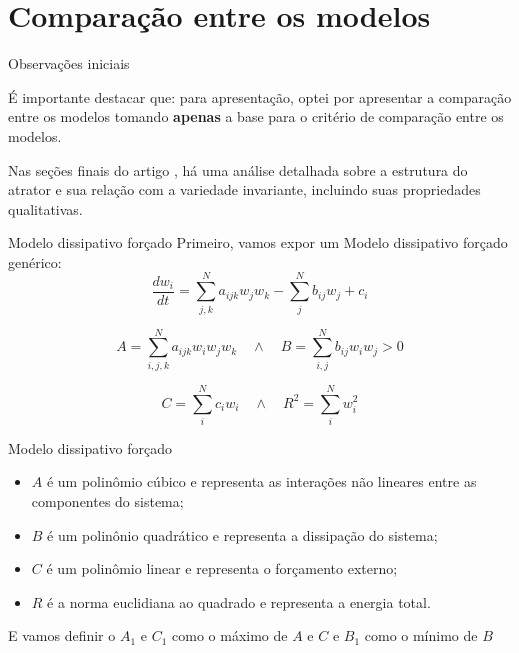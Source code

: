 \section{Comparação entre os modelos} 


\begin{frame}{Observações iniciais}

É importante destacar que: para apresentação, optei por apresentar a comparação entre os modelos tomando \textbf{apenas} a base para o critério de comparação entre os modelos.

Nas seções finais do artigo \cite{lorenz1980}, há uma análise detalhada sobre a estrutura do atrator e sua relação com a variedade invariante, incluindo suas propriedades qualitativas.
\end{frame}


\begin{frame}{Modelo dissipativo forçado}
    Primeiro, vamos expor um Modelo dissipativo forçado genérico:
    \begin{equation}
        \frac{d w_i}{dt} = \sum_{j,k}^N a_{ijk} w_j w_k - \sum_j^N b_{ij} w_j + c_i \label{eq:sistema-generico}
    \end{equation}

    \begin{equation*}
        A = \sum_{i,j,k}^N a_{ijk} w_i w_j w_k \quad \land \quad B = \sum_{i,j}^N b_{ij} w_i w_j > 0
    \end{equation*}

    \begin{equation*}
         C = \sum_i^N c_i w_i \quad \land \quad R^2 = \sum_i^N w_i^2
    \end{equation*}

\end{frame}


\begin{frame}{Modelo dissipativo forçado}

\begin{itemize}
    \item $A$ é um polinômio cúbico e representa as interações não lineares entre as componentes do sistema;
    \item $B$ é um polinônio quadrático e representa a dissipação do sistema;
    \item $C$ é um polinômio linear e representa o forçamento externo;
    \item $R$ é a norma euclidiana ao quadrado e representa a energia total.
\end{itemize}
E vamos definir o $A_1$ e $C_1$ como o máximo de $A$ e $C$ e $B_1$ como o mínimo de $B$
\end{frame}

